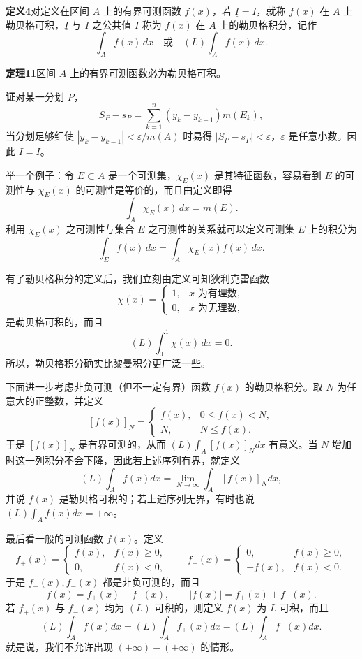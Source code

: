 \noindent\textbf{定义4}\quad 对定义在区间 $A$ 上的有界可测函数 $f(x)$，若 $\underline I=\overline I$，就称 $f(x)$ 在 $A$ 上勒贝格可积，$\underline I$ 与 $\overline I$ 之公共值 $I$ 称为 $f(x)$ 在 $A$ 上的勒贝格积分，记作
\[
\int_A f(x)\,dx\quad\text{或}\quad (L)\int_A f(x)\,dx.
\]

\noindent\textbf{定理11}\quad 区间 $A$ 上的有界可测函数必为勒贝格可积。

\noindent\textbf{证}\quad 对某一分划 $P$，
\[
S_P-s_P=\sum_{k=1}^{n}(y_k-y_{k-1})m(E_k),
\]
当分划足够细使 $|y_k-y_{k-1}|<\varepsilon/m(A)$ 时易得 $|S_P-s_P|<\varepsilon$，$\varepsilon$ 是任意小数。因此 $\underline I=\overline I$。

举一个例子：令 $E\subset A$ 是一个可测集，$\chi_E(x)$ 是其特征函数，容易看到 $E$ 的可测性与 $\chi_E(x)$ 的可测性是等价的，而且由定义即得
\[
\int_A\chi_E(x)\,dx=m(E).
\]
利用 $\chi_E(x)$ 之可测性与集合 $E$ 之可测性的关系就可以定义可测集 $E$ 上的积分为
\[
\int_E f(x)\,dx=\int_A\chi_E(x)f(x)\,dx. \tag{24}
\]

有了勒贝格积分的定义后，我们立刻由定义可知狄利克雷函数
\[
\chi(x)=\begin{cases}1,&x\text{ 为有理数},\\0,&x\text{ 为无理数},\end{cases}
\]
是勒贝格可积的，而且
\[
(L)\int_0^1\chi(x)\,dx=0.
\]
所以，勒贝格积分确实比黎曼积分更广泛一些。

下面进一步考虑非负可测（但不一定有界）函数 $f(x)$ 的勒贝格积分。取 $N$ 为任意大的正整数，并定义
\[
[f(x)]_N=\begin{cases}f(x),&0\le f(x)<N,\\N,&N\le f(x).\end{cases}\tag{25}
\]
于是 $[f(x)]_N$ 是有界可测的，从而 $(L)\int_A[f(x)]_Ndx$ 有意义。当 $N$ 增加时这一列积分不会下降，因此若上述序列有界，就定义
\[
(L)\int_Af(x)dx=\lim_{N\to\infty}\int_A[f(x)]_Ndx, \tag{26}
\]
并说 $f(x)$ 是勒贝格可积的；若上述序列无界，有时也说 $(L)\int_Af(x)dx=+\infty$。

最后看一般的可测函数 $f(x)$。定义
\[
f_+(x)=\begin{cases}f(x),&f(x)\ge0,\\0,&f(x)<0,\end{cases}\qquad
f_-(x)=\begin{cases}0,&f(x)\ge0,\\-f(x),&f(x)<0.\end{cases}
\]
于是 $f_+(x),f_-(x)$ 都是非负可测的，而且
\[
f(x)=f_+(x)-f_-(x),\qquad |f(x)|=f_+(x)+f_-(x).
\]
若 $f_+(x)$ 与 $f_-(x)$ 均为 $(L)$ 可积的，则定义 $f(x)$ 为 $L$ 可积，而且
\[
(L)\int_Af(x)dx=(L)\int_Af_+(x)dx-(L)\int_Af_-(x)dx. \tag{27}
\]
就是说，我们不允许出现 $(+\infty)-(+\infty)$ 的情形。

